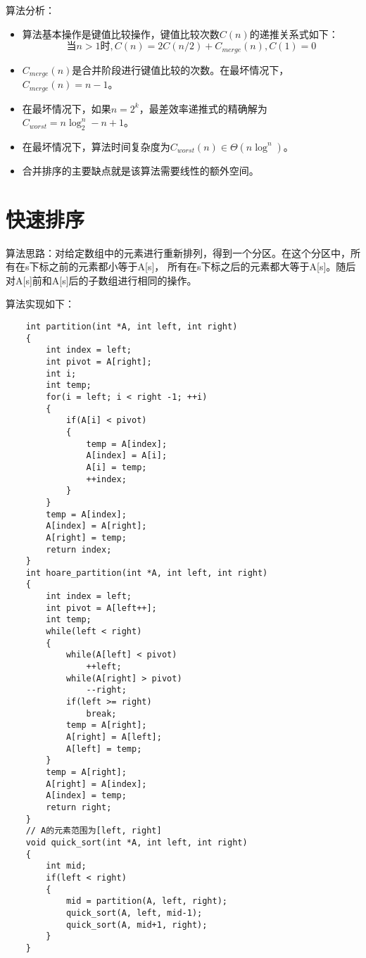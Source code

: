 \documentclass[a4paper,left=2.5cm,right=2.5cm,11pt]{article}
\begin{document}
	算法分析：
	\begin{itemize}
		\item 算法基本操作是键值比较操作，键值比较次数$C(n)$的递推关系式如下：
		\begin{equation}
			\text{当}n>1\text{时},C(n) = 2C(n/2) + C_{merge}(n),C(1) = 0
		\end{equation}
		
		\item $C_{merge}(n)$是合并阶段进行键值比较的次数。在最坏情况下，$C_{merge}(n)=n-1$。
		\item 在最坏情况下，如果$n=2^k$，最差效率递推式的精确解为$C_{worst}=n\log_2^n-n+1$。
		\item 在最坏情况下，算法时间复杂度为$C_{worst}(n) \in \Theta(n\log^n)$。
		\item 合并排序的主要缺点就是该算法需要线性的额外空间。
	\end{itemize}

\section{快速排序}
	算法思路：对给定数组中的元素进行重新排列，得到一个分区。在这个分区中，所有在s下标之前的元素都小等于A[s]，
	所有在s下标之后的元素都大等于A[s]。随后对A[s]前和A[s]后的子数组进行相同的操作。\par

	算法实现如下：
	\begin{lstlisting}
	int partition(int *A, int left, int right)
	{
		int index = left;
		int pivot = A[right];
		int i;
		int temp;
		for(i = left; i < right -1; ++i)
		{
			if(A[i] < pivot)
			{
				temp = A[index];
				A[index] = A[i];
				A[i] = temp;
				++index;
			}
		}
		temp = A[index];
		A[index] = A[right];
		A[right] = temp;
		return index;
	}
	int hoare_partition(int *A, int left, int right)
	{
		int index = left;
		int pivot = A[left++];
		int temp;
		while(left < right)
		{
			while(A[left] < pivot)
				++left;
			while(A[right] > pivot)
				--right;
			if(left >= right)
				break;
			temp = A[right];
			A[right] = A[left];
			A[left] = temp;			
		}
		temp = A[right];
		A[right] = A[index];
		A[index] = temp;
		return right;
	}
	// A的元素范围为[left, right]
	void quick_sort(int *A, int left, int right)
	{
		int mid;
		if(left < right)
		{
			mid = partition(A, left, right);
			quick_sort(A, left, mid-1);
			quick_sort(A, mid+1, right);
		}
	}
	\end{lstlisting}
\end{document}
